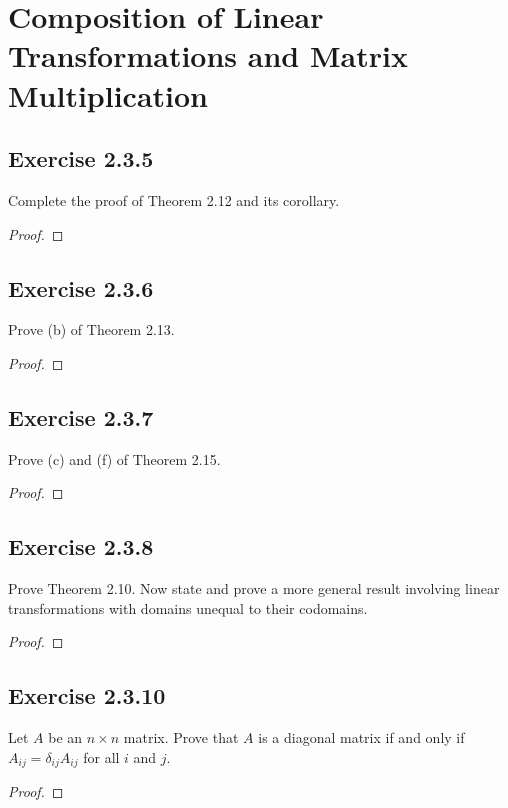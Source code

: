\section{Composition of Linear Transformations and Matrix Multiplication}


\subsection*{Exercise 2.3.5} Complete the proof of Theorem 2.12 and its corollary. 
\begin{proof}

\end{proof}

\subsection*{Exercise 2.3.6} Prove (b) of Theorem 2.13.
\begin{proof}

\end{proof}

\subsection*{Exercise 2.3.7} Prove (c) and (f) of Theorem 2.15.
\begin{proof}

\end{proof}

\subsection*{Exercise 2.3.8} Prove Theorem 2.10. Now state and prove a more general result involving linear transformations with domains unequal to their codomains.
\begin{proof}

\end{proof}

\subsection*{Exercise 2.3.10} Let \( A  \) be an \( n \times n  \) matrix. Prove that \( A  \) is a diagonal matrix if and only if \( {A}_{ij} = {\delta}_{ij} {A}_{ij}  \) for all \( i  \) and \( j \).
\begin{proof}

\end{proof}

